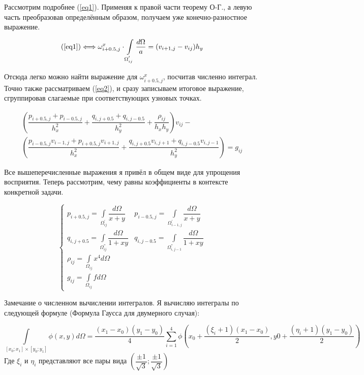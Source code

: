 \documentclass[12pt]{article}
\begin{document}
Рассмотрим подробнее (\ref{eq1}). Применяя к правой части теорему О-Г., а левую часть преобразовав определённым образом, получаем уже конечно-разностное выражение.

$$
(\ref{eq1}) \Longleftrightarrow \omega_{i+0.5,j}^x \cdot \int\limits_{\Omega_{ij}^{'}}{\dfrac{d\Omega}{a}} = (v_{i+1,j} - v_{ij})h_y
$$

Отсюда легко можно найти выражение для $\omega_{i+0.5,j}^x$, посчитав численно интеграл. Точно также рассматриваем (\ref{eq2}), и сразу записываем итоговое выражение, сгруппировав слагаемые при соответствующих узновых точках.

\begin{eqnarray}
\left( \dfrac{p_{i+0.5, j} + p_{i-0.5, j}}{h_x^2} + \dfrac{q_{i, j+0.5} + q_{i, j-0.5}}{h_y^2} + \dfrac{\rho_{ij}}{h_xh_y} \right) v_{ij} - \nonumber \\
\left( \dfrac{p_{i-0.5, j}v_{i-1,j} + p_{i+0.5, j}v_{i+1,j}}{h_x^2} + \dfrac{q_{i, j+0.5}v_{i,j+1} + q_{i, j-0.5}v_{i,j-1}}{h_y^2} \right) = g_{ij}
\end{eqnarray}

Все вышеперечисленные выражения я привёл в общем виде для упрощения восприятия. Теперь рассмотрим, чему равны коэффициенты в контексте конкретной задачи.

\begin{equation}
\begin{cases}
p_{i+0.5,j} = \int\limits_{\Omega_{ij}^{'}}{\dfrac{d\Omega}{x + y}} &
p_{i-0.5,j} = \int\limits_{\Omega_{i-1,j}^{'}}{\dfrac{d\Omega}{x + y}} \\
q_{i,j+0.5} = \int\limits_{\Omega_{ij}^{''}}{\dfrac{d\Omega}{1 + xy}} &
q_{i,j-0.5} = \int\limits_{\Omega_{i,j-1}^{''}}{\dfrac{d\Omega}{1 + xy}} \\
\rho_{ij} = \int\limits_{\Omega_{ij}}{x^4 d \Omega} \\
g_{ij} = \int\limits_{\Omega_{ij}}{fd \Omega} 
\end{cases}
\end{equation}

Замечание о численном вычислении интегралов. Я вычисляю интегралы по следующей формуле (Формула Гаусса для двумерного случая):

\begin{equation}
\int\limits_{[x_0; x_1] \times [y_0; y_1]}{\phi(x, y)d\Omega} = \dfrac{(x_1-x_0)(y_1-y_0)}{4} \sum\limits_{i=1}^4\phi\left(x_0 + \dfrac{(\xi_i+1)(x_1-x_0)}{2} ,y0 + \dfrac{(\eta_i+1)(y_1-y_0)}{2} \right)
\end{equation}
Где $\xi_i$ и $\eta_i$ представляют все пары вида $\left(\dfrac{\pm 1}{\sqrt{3}}; \dfrac{\pm 1}{\sqrt{3}}\right)$
 
\end{document}
